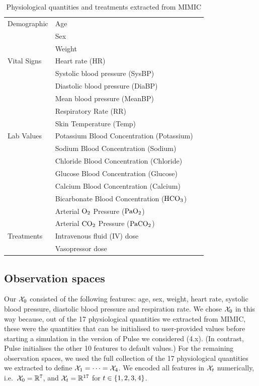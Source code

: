 \begin{table}[t]
\begin{footnotesize}
\begin{tabular}{lll}
\midrule
Demographic & Age \\
& Sex  \\
& Weight \\
\midrule
Vital Signs & Heart rate (HR)  \\
& Systolic blood pressure (SysBP)  \\
& Diastolic blood pressure (DiaBP)  \\
& Mean blood pressure (MeanBP) \\
& Respiratory Rate (RR) \\
& Skin Temperature (Temp) \\
\midrule
Lab Values & Potassium Blood Concentration (Potassium)  \\
& Sodium Blood Concentration (Sodium)  \\
& Chloride Blood Concentration (Chloride)  \\
& Glucose Blood Concentration (Glucose)  \\
& Calcium Blood Concentration (Calcium)  \\
& Bicarbonate Blood Concentration ($\textup{HCO}_3$)  \\
& Arterial $\textup{O}_2$ Pressure ($\textup{PaO}_2$)  \\
& Arterial $\textup{CO}_2$ Pressure ($\textup{PaCO}_2$) \\
\midrule
Treatments & Intravenous fluid (IV) dose \\
& Vasopressor dose \\
\bottomrule
\end{tabular}
\end{footnotesize}
\caption{Physiological quantities and treatments extracted from MIMIC}\label{tab:mimic-features}
\end{table}

\subsection{Observation spaces} \label{sec:observation-space-definition-supp}

Our $\mathcal{X}_0$ consisted of the following features: age, sex, weight, heart rate, systolic blood pressure, diastolic blood pressure and respiration rate.
We chose $\mathcal{X}_0$ in this way because, out of the 17 physiological quantities we extracted from MIMIC, these were the quantities that can be initialised to user-provided values before starting a simulation in the version of Pulse we considered (4.x).
(In contrast, Pulse initialises the other 10 features to default values.)
For the remaining observation spaces, we used the full collection of the 17 physiological quantities we extracted to define $\mathcal{X}_1 = \cdots = \mathcal{X}_4$.
We encoded all features in $\mathcal{X}_t$ numerically, i.e.\ $\mathcal{X}_0 = \mathbb{R}^7$, and $\mathcal{X}_t = \mathbb{R}^{17}$ for $t \in \{1, 2, 3, 4\}$.


